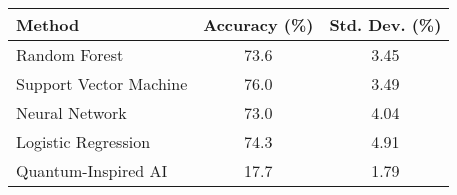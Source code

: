 \begin{tabular}{lcc}
\toprule
Method & Accuracy (\%) & Std. Dev. (\%) \\
\midrule
Random Forest & 73.6 & 3.45 \\
Support Vector Machine & 76.0 & 3.49 \\
Neural Network & 73.0 & 4.04 \\
Logistic Regression & 74.3 & 4.91 \\
Quantum-Inspired AI & 17.7 & 1.79 \\
\bottomrule
\end{tabular}
